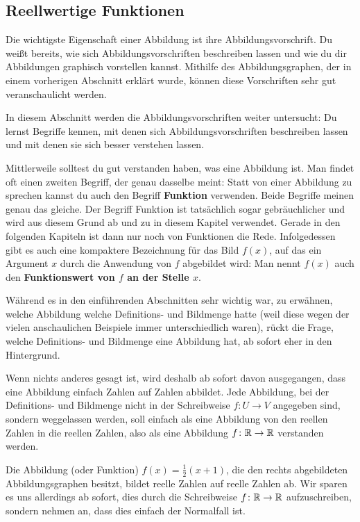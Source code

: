 \documentclass[../../main.tex]{subfiles}
\begin{document}
\subsection{Reellwertige Funktionen}

Die wichtigste Eigenschaft einer Abbildung ist ihre Abbildungsvorschrift. Du weißt bereits, wie sich Abbildungsvorschriften beschreiben lassen und wie du dir Abbildungen graphisch vorstellen kannst. Mithilfe des Abbildungsgraphen, der in einem vorherigen Abschnitt erklärt wurde, können diese Vorschriften sehr gut veranschaulicht werden.

In diesem Abschnitt werden die Abbildungsvorschriften weiter untersucht: Du lernst Begriffe kennen, mit denen sich Abbildungsvorschriften beschreiben lassen und mit denen sie sich besser verstehen lassen. 

Mittlerweile solltest du gut verstanden haben, was eine Abbildung ist. Man findet oft einen zweiten Begriff, der genau dasselbe meint: Statt von einer Abbildung zu sprechen kannst du auch den Begriff \textbf{Funktion} verwenden. Beide Begriffe meinen genau das gleiche. Der Begriff Funktion ist tatsächlich sogar gebräuchlicher und wird aus diesem Grund ab und zu in diesem Kapitel verwendet. Gerade in den folgenden Kapiteln ist dann nur noch von Funktionen die Rede. Infolgedessen gibt es auch eine kompaktere Bezeichnung für das Bild $f(x)$, auf das ein Argument $x$ durch die Anwendung von $f$ abgebildet wird: Man nennt $f(x)$ auch den \textbf{Funktionswert von $f$ an der Stelle $x$}.

Während es in den einführenden Abschnitten sehr wichtig war, zu erwähnen, welche Abbildung welche Definitions- und Bildmenge hatte (weil diese wegen der vielen anschaulichen Beispiele immer unterschiedlich waren), rückt die Frage, welche Definitions- und Bildmenge eine Abbildung hat, ab sofort eher in den Hintergrund. 

Wenn nichts anderes gesagt ist, wird deshalb ab sofort davon ausgegangen, dass eine Abbildung einfach Zahlen auf Zahlen abbildet. Jede Abbildung, bei der Definitions- und Bildmenge nicht in der Schreibweise $f\colon U\rightarrow V$ angegeben sind, sondern weggelassen werden, soll einfach als eine Abbildung von den reellen Zahlen in die reellen Zahlen, also als eine Abbildung $f\colon\mathbb{R}\rightarrow\mathbb{R}$ verstanden werden.

\begin{example}
    Die Abbildung (oder Funktion) $f(x)=\frac{1}{2}(x+1)$, die den rechts abgebildeten Abbildungsgraphen besitzt, bildet reelle Zahlen auf reelle Zahlen ab. Wir sparen es uns allerdings ab sofort, dies durch die Schreibweise $f\colon\mathbb{R}\rightarrow\mathbb{R}$ aufzuschreiben, sondern nehmen an, dass dies einfach der Normalfall ist.
\end{example}
\end{document}
